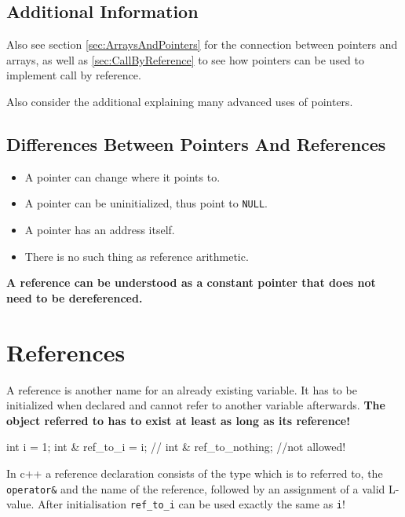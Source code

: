 \documentclass[10pt,a4paper]{scrartcl}
\begin{document}
\begin{multicols*}{2}
\subsection{Additional Information}
\label{sec:AdditionalInformation}

Also see section \ref{sec:ArraysAndPointers} for the connection between pointers and arrays, as well as \ref{sec:CallByReference} to see how pointers can be used to implement call by reference.

Also consider the additional  explaining many advanced uses of pointers.

\subsection{Differences Between Pointers And References}
\label{sec:DifferenceBetweenPointersAndReferences}

\begin{itemize}
\item A pointer can change where it points to.
\item A pointer can be uninitialized, thus point to \verb+NULL+.
\item A pointer has an address itself.
\item There is no such thing as reference arithmetic.
\end{itemize}

\textbf{A reference can be understood as a constant pointer that does not need to be dereferenced.}

\section{References}
\label{sec:References}

A reference is another name for an already existing variable. It has to be initialized when declared and cannot refer to another variable afterwards. \textbf{The object referred to has to exist at least as long as its reference!}

\begin{TPCpp}
int i = 1;
int & ref_to_i = i;
// int & ref_to_nothing; //not allowed!
\end{TPCpp}

In c++ a reference declaration consists of the type which is to referred to, the \verb+operator&+ and the name of the reference, followed by an assignment of a valid L-value. After initialisation \verb+ref_to_i+ can be used exactly the same as \verb+i+!


\end{multicols*}
\end{document}
